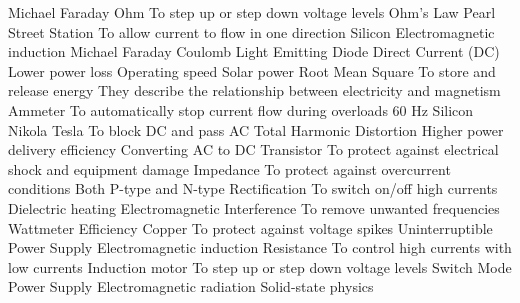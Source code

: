 \answerkey
{} Michael Faraday
 Ohm
 To step up or step down voltage levels
 Ohm's Law
 Pearl Street Station
 To allow current to flow in one direction
 Silicon
 Electromagnetic induction
 Michael Faraday
 Coulomb
 Light Emitting Diode
 Direct Current (DC)
 Lower power loss
 Operating speed
 Solar power
 Root Mean Square
 To store and release energy
 They describe the relationship between electricity and magnetism
 Ammeter
 To automatically stop current flow during overloads
 60 Hz
 Silicon
 Nikola Tesla
 To block DC and pass AC
 Total Harmonic Distortion
 Higher power delivery efficiency
 Converting AC to DC
 Transistor
 To protect against electrical shock and equipment damage
 Impedance
 To protect against overcurrent conditions
 Both P-type and N-type
 Rectification
 To switch on/off high currents
 Dielectric heating
 Electromagnetic Interference
 To remove unwanted frequencies
 Wattmeter
 Efficiency
 Copper
 To protect against voltage spikes
 Uninterruptible Power Supply
 Electromagnetic induction
 Resistance
 To control high currents with low currents
 Induction motor
 To step up or step down voltage levels
 Switch Mode Power Supply
 Electromagnetic radiation
 Solid-state physics
\endanswerkey